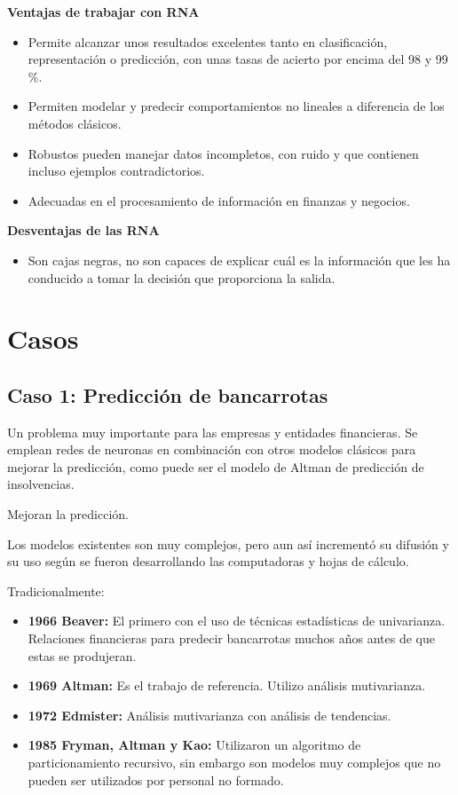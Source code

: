 \documentclass[12pt, twoside, openright]{report} %
\begin{document}
\textbf{Ventajas de trabajar con RNA}
\begin{itemize}
	\item Permite alcanzar unos resultados excelentes tanto en clasificación, representación o predicción, con unas tasas de acierto por encima del 98 y 99 \%.
	\item Permiten modelar y predecir comportamientos no lineales a diferencia de los métodos clásicos.
	\item Robustos pueden manejar datos incompletos, con ruido y que contienen incluso ejemplos contradictorios.
	\item Adecuadas en el procesamiento de información en finanzas y negocios.
\end{itemize}

\textbf{Desventajas de las RNA}
\begin{itemize}
	\item Son cajas negras, no son capaces de explicar cuál es la información que les ha conducido a tomar la decisión que proporciona la salida.
\end{itemize}


\section{Casos}
\subsection{Caso 1: Predicción de bancarrotas}
Un problema muy importante para las empresas y entidades financieras. Se emplean redes de neuronas en combinación con otros modelos clásicos para mejorar la predicción, como puede ser el modelo de Altman de predicción de insolvencias.

Mejoran la predicción.

Los modelos existentes son muy complejos, pero aun así incrementó su difusión y su uso según se fueron desarrollando las computadoras y hojas de cálculo.

Tradicionalmente:
\begin{itemize}
	\item \textbf{1966 Beaver:} El primero con el uso de técnicas estadísticas de univarianza. Relaciones financieras para predecir bancarrotas muchos años antes de que estas se produjeran.
	\item \textbf{1969 Altman:} Es el trabajo de referencia. Utilizo análisis mutivarianza.
	\item \textbf{1972 Edmister:} Análisis mutivarianza con análisis de tendencias.
	\item \textbf{1985 Fryman, Altman y Kao:} Utilizaron un algoritmo de particionamiento recursivo, sin embargo son modelos muy complejos que no pueden ser utilizados por personal no formado.
\end{itemize}
\end{document}
